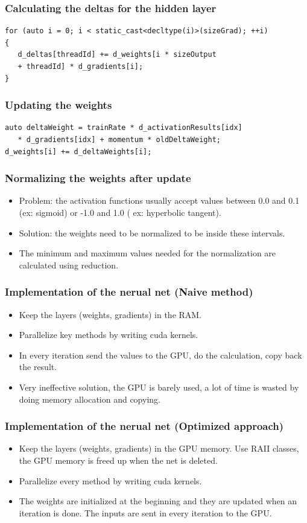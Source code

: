 \documentclass{beamer}
\begin{document}
\begin{frame}[fragile]
\frametitle{Calculating the deltas for the hidden layer}
\begin{verbatim}
for (auto i = 0; i < static_cast<decltype(i)>(sizeGrad); ++i)
{
   d_deltas[threadId] += d_weights[i * sizeOutput
   + threadId] * d_gradients[i];
}
\end{verbatim}
\end{frame}

\begin{frame}[fragile]
\frametitle{Updating the weights}
\begin{verbatim}
auto deltaWeight = trainRate * d_activationResults[idx] 
   * d_gradients[idx] + momentum * oldDeltaWeight;
d_weights[i] += d_deltaWeights[i];
\end{verbatim}
\end{frame}

\begin{frame}
\frametitle{Normalizing the weights after update}
\begin{itemize}
\item Problem: the activation functions usually accept values between 0.0 and 0.1 (ex: sigmoid) or -1.0 and 1.0 ( ex: hyperbolic tangent). 
\item Solution: the weights need to be normalized to be inside these intervals.
\item The minimum and maximum values needed for the normalization are calculated using reduction.
\end{itemize}
\end{frame}

\begin{frame}
\frametitle{Implementation of the nerual net (Naive method)}
\begin{itemize}
\item Keep the layers (weights, gradients) in the RAM. 
\item Parallelize key methods by writing cuda kernels.
\item In every iteration send the values to the GPU, do the calculation, copy back the result.
\item Very ineffective solution, the GPU is barely used, a lot of time is wasted by doing memory allocation and copying. 
\end{itemize}
\end{frame}

\begin{frame}
\frametitle{Implementation of the nerual net (Optimized approach)}
\begin{itemize}
\item Keep the layers (weights, gradients) in the GPU memory. Use RAII classes, the GPU memory is freed up when the net is deleted. 
\item Parallelize every method by writing cuda kernels.
\item The weights are initialized at the beginning and they are updated when an iteration is done. The inputs are sent in every iteration to the GPU. 
\end{itemize}
\end{frame}
\end{document}
